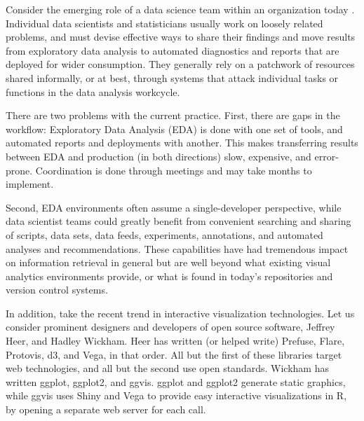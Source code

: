 

\maketitle


Consider the emerging role of a data science team within an
organization today \cite{Keim:2008:VAS}.
%
Individual data scientists and statisticians usually work on loosely
related problems, and must devise effective ways to share their findings
and move results from exploratory data analysis to automated diagnostics
and reports that are deployed for wider consumption.
They generally rely on a patchwork of resources shared informally,
or at best, through systems that attack individual tasks or functions
in the data analysis workcycle. %

There are two problems with the current practice. First, there are
gaps in the workflow: Exploratory Data Analysis (EDA) is done with one
set of tools, and automated reports and deployments with another. This
makes transferring results between EDA and production (in both
directions) slow, expensive, and error-prone. Coordination is done
through meetings and may take months to implement.

Second, EDA environments often assume a single-developer perspective,
while data scientist teams could greatly benefit from convenient searching
and sharing of scripts, data sets, data feeds, experiments, annotations,
and automated analyses and recommendations. These capabilities have had
tremendous impact on information retrieval in general but are well
beyond what existing visual analytics environments provide, or what
is found in today's repositories and version control
systems. 

In addition, take the recent trend in interactive visualization
technologies. Let us consider prominent designers and developers of
open source software, Jeffrey Heer, and Hadley Wickham. Heer has
written (or helped write) Prefuse, Flare, Protovis, d3, and Vega, in
that order. All but the first of these libraries target web
technologies, and all but the second use open standards. Wickham has
written ggplot, ggplot2, and ggvis. ggplot and
ggplot2 generate static graphics, while ggvis uses Shiny and Vega to
provide easy interactive visualizations in R, by opening a separate
web server for each call. 

